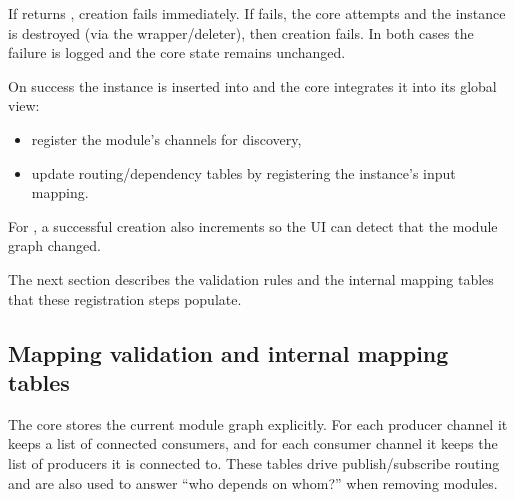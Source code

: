 If  returns , creation fails immediately.
If  fails, the core attempts  and the instance is destroyed (via the wrapper/deleter), then creation fails.
In both cases the failure is logged and the core state remains unchanged.

On success the instance is inserted into  and the core integrates it into its global view:
\begin{itemize}
    \item register the module's channels for discovery,
    \item update routing/dependency tables by registering the instance's input mapping.
\end{itemize}

For , a successful creation also increments  so the UI can detect that the module graph changed.

The next section describes the validation rules and the internal mapping tables that these registration steps populate.


\subsection{Mapping validation and internal mapping tables} \label{subsec:ch3_core_mapping_validation}

The core stores the current module graph explicitly. For each producer channel it keeps a list of connected consumers, and for each consumer channel it keeps the list of producers it is connected to.
These tables drive publish/subscribe routing and are also used to answer “who depends on whom?” when removing modules.

